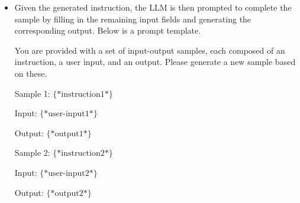 \begin{itemize}
\begin{tcolorbox}
    Task 3: $\{*\mathrm{instruction}3*\}$

    \vspace{0.2cm}

    Task 4: $\{*\mathrm{instruction}4*\}$

    \vspace{0.2cm}

    New Task: \underline{\hspace{2em}}

    \endgroup

    \end{tcolorbox}
    \vspace{0.5em}

\item \vspace{0.3em} Given the generated instruction, the LLM is then prompted to complete the sample by filling in the remaining input fields and generating the corresponding output. Below is a prompt template.

    \vspace{0.5em}
    \begin{tcolorbox}

    \begingroup
    \setlength{\leftskip}{2em}
    \setlength{\rightskip}{2em}

    You are provided with a set of input-output samples, each composed of an instruction, a user input, and an output. Please generate a new sample based on these.

    \vspace{0.2cm}

    Sample 1: $\{*\mathrm{instruction}1*\}$

    \vspace{0.1cm}

    Input: $\{*\mathrm{user\text{-}input}1*\}$

    \vspace{0.1cm}

    Output: $\{*\mathrm{output}1*\}$

    \vspace{0.2cm}

    Sample 2: $\{*\mathrm{instruction}2*\}$

    \vspace{0.1cm}

    Input: $\{*\mathrm{user\text{-}input}2*\}$

    \vspace{0.1cm}

    Output: $\{*\mathrm{output}2*\}$


\end{tcolorbox}
\end{itemize}
